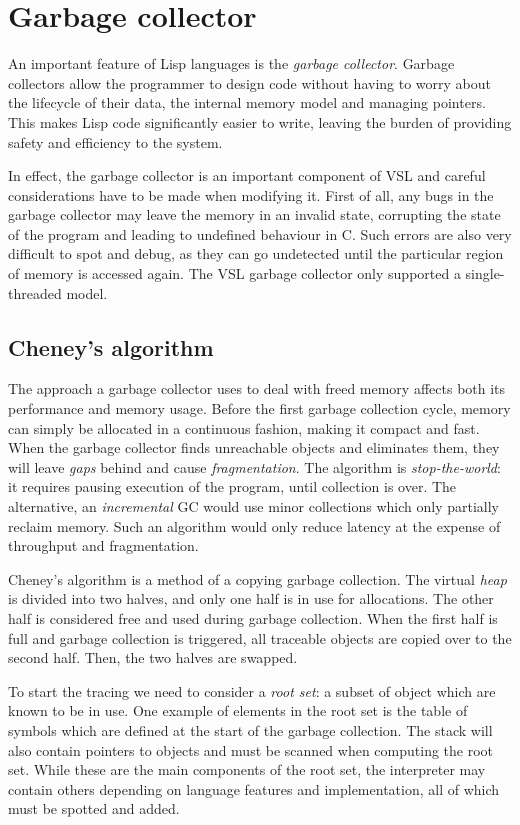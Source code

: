 \section{Garbage collector}
An important feature of Lisp languages is the \emph{garbage collector}. Garbage collectors allow the programmer
to design code without having to worry about the lifecycle of their data, the internal memory model and
managing pointers. This makes Lisp code significantly easier to write, leaving the burden of providing safety and
efficiency to the system.

In effect, the garbage collector is an important component of VSL and careful considerations
have to be made when modifying it. First of all, any bugs in the garbage collector may leave the memory in
an invalid state, corrupting the state of the program and leading to undefined behaviour in C. Such errors
are also very difficult to spot and debug, as they can go undetected until the particular region of memory
is accessed again. The VSL garbage collector only supported a single-threaded model.

\subsection{Cheney's algorithm}
The approach a garbage collector uses to deal with freed memory affects both its performance and memory usage.
Before the first garbage collection cycle, memory can simply be allocated in a continuous fashion, making it
compact and fast. When the garbage collector finds unreachable objects and eliminates them, they will leave
\emph{gaps} behind and cause \emph{fragmentation}. The algorithm is \emph{stop-the-world}:
it requires pausing execution of the program, until collection is over.
The alternative, an \emph{incremental} GC would use minor collections which only partially reclaim memory.
Such an algorithm would only reduce latency at the expense of throughput and fragmentation.

Cheney's algorithm \cite{cheney} is a method of a copying garbage collection.
The virtual \emph{heap} is divided into
two halves, and only one half is in use for allocations. The other half is considered free and used during garbage
collection. When the first half is full and garbage collection is triggered, all traceable objects are copied over
to the second half. Then, the two halves are swapped.

To start the tracing we need to consider a \emph{root set}: a subset of object which are known to be in use.
One example of elements in the root set is the table of symbols which are defined at the start
of the garbage collection.
The stack will also contain pointers to objects and must be scanned when computing the root set.
While these are the main components of the root set, the interpreter may contain others depending on language features
and implementation, all of which must be spotted and added.

